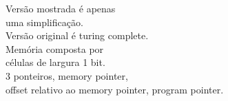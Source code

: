 \documentclass[preview]{standalone}
\begin{document}
Versão mostrada é apenas\\uma simplificação.\\Versão original é turing complete.\\Memória composta por\\células de largura 1 bit.\\3 ponteiros, memory pointer, \\offset relativo ao memory pointer, program pointer.\\
\end{document}
